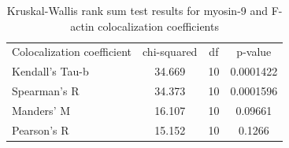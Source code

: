 \documentclass[english,authoryear]{elsarticle}
\begin{document}
\begin{table} [h]
  \caption{Kruskal-Wallis rank sum test results for myosin-9 and F-actin colocalization coefficients}
  \label{tab1}
\centering
\begin{tabular}{l|ccc}
 Colocalization coefficient & chi-squared & df & p-value  \\
 Kendall's Tau-b & 34.669 & 10 & 0.0001422 \\
 Spearman's R & 34.373 & 10 &  0.0001596 \\
 Manders' M & 16.107 & 10 & 0.09661 \\
 Pearson's R & 15.152 & 10 & 0.1266

\end{tabular}
\end{table}
\end{document}
